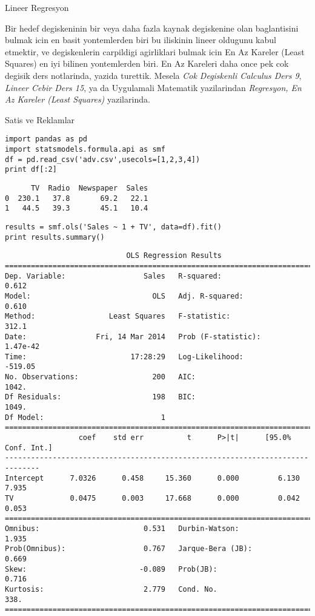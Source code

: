\documentclass[12pt,fleqn]{article}\usepackage{../common}
\begin{document}
Lineer Regresyon

Bir hedef degiskeninin bir veya daha fazla kaynak degiskenine olan
baglantisini bulmak icin en basit yontemlerden biri bu iliskinin lineer
oldugunu kabul etmektir, ve degiskenlerin carpildigi agirliklari bulmak
icin En Az Kareler (Least Squares) en iyi bilinen yontemlerden biri. En Az
Kareleri daha once pek cok degisik ders notlarinda, yazida turettik. Mesela
{\em Cok Degiskenli Calculus Ders 9}, {\em Lineer Cebir Ders 15}, ya da
Uygulamali Matematik yazilarindan {\em Regresyon, En Az Kareler (Least
  Squares)} yazilarinda. 

Satis ve Reklamlar

\begin{verbatim}
import pandas as pd
import statsmodels.formula.api as smf
df = pd.read_csv('adv.csv',usecols=[1,2,3,4])
print df[:2]
\end{verbatim}

\begin{verbatim}
      TV  Radio  Newspaper  Sales
0  230.1   37.8       69.2   22.1
1   44.5   39.3       45.1   10.4
\end{verbatim}

\begin{verbatim}
results = smf.ols('Sales ~ 1 + TV', data=df).fit()
print results.summary()
\end{verbatim}

\begin{verbatim}
                            OLS Regression Results                            
==============================================================================
Dep. Variable:                  Sales   R-squared:                       0.612
Model:                            OLS   Adj. R-squared:                  0.610
Method:                 Least Squares   F-statistic:                     312.1
Date:                Fri, 14 Mar 2014   Prob (F-statistic):           1.47e-42
Time:                        17:28:29   Log-Likelihood:                -519.05
No. Observations:                 200   AIC:                             1042.
Df Residuals:                     198   BIC:                             1049.
Df Model:                           1                                         
==============================================================================
                 coef    std err          t      P>|t|      [95.0% Conf. Int.]
------------------------------------------------------------------------------
Intercept      7.0326      0.458     15.360      0.000         6.130     7.935
TV             0.0475      0.003     17.668      0.000         0.042     0.053
==============================================================================
Omnibus:                        0.531   Durbin-Watson:                   1.935
Prob(Omnibus):                  0.767   Jarque-Bera (JB):                0.669
Skew:                          -0.089   Prob(JB):                        0.716
Kurtosis:                       2.779   Cond. No.                         338.
==============================================================================
\end{verbatim}
\end{document}
